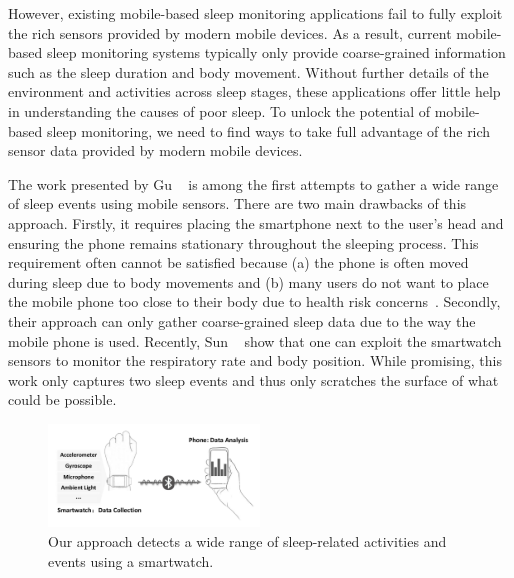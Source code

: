 
However, existing mobile-based sleep monitoring applications fail to fully exploit the rich sensors provided by modern mobile devices. As a
result, current mobile-based sleep monitoring systems typically only provide coarse-grained information such as the sleep duration and body
movement. Without further details of the environment and activities across sleep stages, these applications offer little help in
understanding the causes of poor sleep. To unlock the potential of mobile-based sleep monitoring, we need to find ways to take full
advantage of the rich sensor data provided by modern mobile devices.


The work presented by Gu \etal~\cite{gu2016sleep} is among the first attempts to gather  a wide range of sleep events using mobile sensors.
There are two main drawbacks of this approach. Firstly, it requires placing the smartphone next to the user's head and ensuring the phone
remains stationary throughout the sleeping process. This requirement often cannot be satisfied because (a) the phone is often moved during
sleep due to body movements and (b) many users do not want to place the mobile phone too close to their body due to health risk
concerns~\cite{StepHealth,Quorasleep}.  Secondly, their approach can only gather coarse-grained sleep data due to the way the mobile phone
is used. Recently, Sun \etal~\cite{sleepmonitor} show that one can exploit the smartwatch sensors to monitor the respiratory  rate and body
position. While promising, this work only captures two sleep events and thus only scratches the surface of what could be possible.


\begin{figure}[!t]
\centering
\setlength{\belowcaptionskip}{-13pt}
      \includegraphics[width=0.5\textwidth]{Figures/datacollect.pdf}
  \caption{Our approach detects a wide range of sleep-related activities and events using a smartwatch.}\label{fig:datacollect}
\end{figure}

